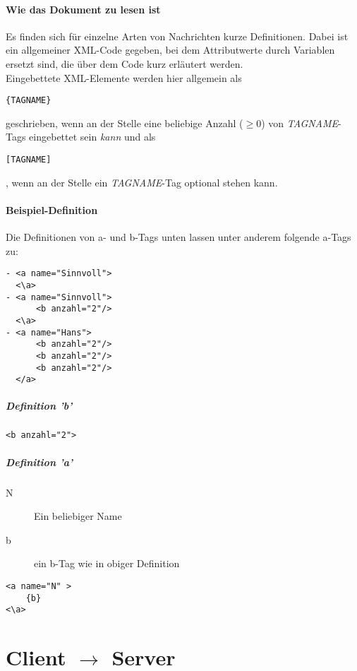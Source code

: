 \documentclass[12pt,a4paper, ngerman, oneside]{scrartcl}
\begin{document}
\subsection*{Wie das Dokument zu lesen ist}
Es finden sich für einzelne Arten von Nachrichten kurze Definitionen. Dabei ist ein allgemeiner XML-Code gegeben, bei dem Attributwerte durch Variablen ersetzt sind, die über dem Code kurz erläutert werden.\\
Eingebettete XML-Elemente werden hier allgemein als \begin{verbatim}
{TAGNAME}
\end{verbatim} geschrieben, wenn an der Stelle eine beliebige Anzahl ($\geq 0$) von \textit{TAGNAME}-Tags eingebettet sein \textit{kann} und als \begin{verbatim}
[TAGNAME]
\end{verbatim}, wenn an der Stelle ein \textit{TAGNAME}-Tag optional stehen kann. \\

\subsection{Beispiel-Definition}
Die Definitionen von a- und b-Tags unten lassen unter anderem folgende a-Tags zu:
\begin{verbatim}
- <a name="Sinnvoll">
  <\a>
- <a name="Sinnvoll">
      <b anzahl="2"/>
  <\a>
- <a name="Hans">
      <b anzahl="2"/>
      <b anzahl="2"/>
      <b anzahl="2"/>
  </a>
\end{verbatim}
\subsubsection*{Definition 'b'}
\begin{verbatim}
<b anzahl="2">
\end{verbatim}
\subsubsection*{Definition 'a'}
\begin{description}
\item[N] Ein beliebiger Name
\item[b] ein b-Tag wie in obiger Definition
\end{description}
\begin{verbatim}
<a name="N" >
	{b}
<\a>
\end{verbatim}

\newpage
\part{Client $\rightarrow$ Server}
\end{document}
